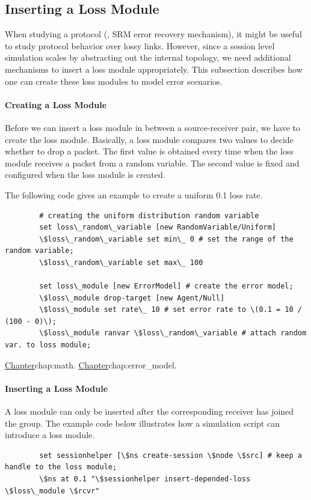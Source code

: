 \subsection{Inserting a Loss Module}
\label{sec:loss-config}

When studying a protocol (\eg, SRM error recovery mechanism), 
it might be useful to study protocol behavior over lossy links.
However, since a session level simulation scales by abstracting 
out the internal topology,
we need additional mechanisms to insert a loss module appropriately.
This subsection describes how one can create these loss modules to
model error scenarios.


\paragraph{Creating a Loss Module}
Before we can insert a loss module in between a source-receiver pair,
we have to create the loss module.  Basically,
a loss module compares two values to decide whether to drop a packet.
The first value is obtained every time when the loss module receives 
a packet from a random variable.  The second value
is fixed and configured when the loss module is created.

The following code gives an example to create a uniform 0.1 loss rate.
\begin{verbatim}
        # creating the uniform distribution random variable
        set loss\_random\_variable [new RandomVariable/Uniform] 
        \$loss\_random\_variable set min\_ 0 # set the range of the random variable;
        \$loss\_random\_variable set max\_ 100

        set loss\_module [new ErrorModel] # create the error model;
        \$loss\_module drop-target [new Agent/Null] 
        \$loss\_module set rate\_ 10 # set error rate to \(0.1 = 10 / (100 - 0)\);
        \$loss\_module ranvar \$loss\_random\_variable # attach random var. to loss module;
\end{verbatim}
\href{A catalogue of the random variable distributions was described earlier}{%
        Chapter}{chap:math}.
\href{A more detailed discussion of error models was also described earlier
in a different chapter}{Chapter}{chap:error_model}.

\paragraph{Inserting a Loss Module}
A loss module can only be inserted after the corresponding receiver
has joined the group.  The example code below illustrates how
a simulation script can introduce a loss module.
\begin{verbatim}
        set sessionhelper [\$ns create-session \$node \$src] # keep a handle to the loss module;
        \$ns at 0.1 "\$sessionhelper insert-depended-loss \$loss\_module \$rcvr" 
\end{verbatim}

